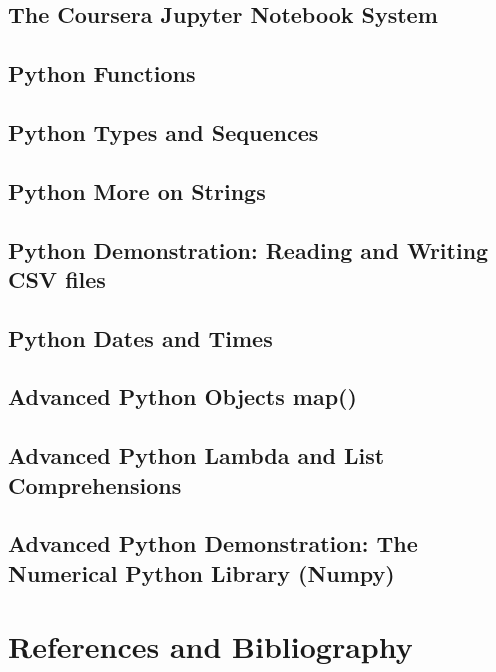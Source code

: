 \documentclass[11pt]{article}
\begin{document}
\subsection{The Coursera Jupyter Notebook System}




\subsection{Python Functions}

\subsection{Python Types and Sequences}

\subsection{Python More on Strings}

\subsection{Python Demonstration: Reading and Writing CSV files}

\subsection{Python Dates and Times}

\subsection{Advanced Python Objects map()}

\subsection{Advanced Python Lambda and List Comprehensions}

\subsection{Advanced Python Demonstration: The Numerical Python Library (Numpy)}
























\section{References and Bibliography}






\end{document}
